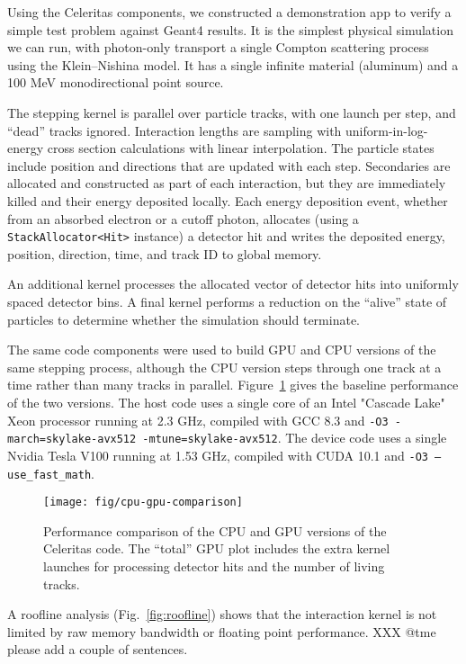 \documentclass{webofc}
\begin{document}
Using the Celeritas components, we constructed a demonstration app to verify a
simple test problem against Geant4 results. It is the simplest physical
simulation we can run, with photon-only transport a single
Compton scattering process using the Klein--Nishina model.  It has a single
infinite material (aluminum) and a 100 MeV monodirectional point source.

The stepping kernel is parallel over particle tracks, with one launch per step,
and ``dead'' tracks ignored. Interaction lengths are sampling with
uniform-in-log-energy cross section calculations with linear interpolation. The
particle states include position and directions that are updated with each step.
Secondaries are allocated and constructed as part of each interaction, but they
are immediately killed and their energy deposited locally. Each energy
deposition event, whether from an absorbed electron or a cutoff photon,
allocates (using a \texttt{StackAllocator<Hit>} instance) a detector hit and
writes the deposited energy, position, direction, time, and track ID to global
memory.

An additional kernel processes the allocated vector of detector hits into
uniformly spaced detector bins. A final kernel performs a reduction on the
``alive'' state of particles to determine whether the simulation should
terminate.

The same code components were used to build GPU and CPU versions of the same
stepping process, although the CPU version steps through one track at a time
rather than many tracks in parallel.  Figure~\ref{fig:baseline} gives the
baseline performance of the two versions. The host code uses a single core of an
Intel "Cascade Lake" Xeon processor running at 2.3 GHz, compiled with GCC 8.3
and \texttt{-O3 -march=skylake-avx512 -mtune=skylake-avx512}. The device code
uses a single Nvidia Tesla V100 running at 1.53 GHz, compiled with CUDA 10.1 and
\texttt{-O3 --use\_fast\_math}.

\begin{figure}[htb]
  \centering
  \texttt{[image: fig/cpu-gpu-comparison]}
  \caption{Performance comparison of the CPU and GPU versions of the Celeritas
  code. The ``total'' GPU plot includes the extra kernel launches for processing
  detector hits and the number of living tracks.}
  \label{fig:baseline}
\end{figure}

A roofline analysis (Fig.~\ref{fig:roofline}) shows that the interaction kernel
is not limited by raw memory bandwidth or floating point performance. XXX @tme
please add a couple of sentences.
\end{document}
